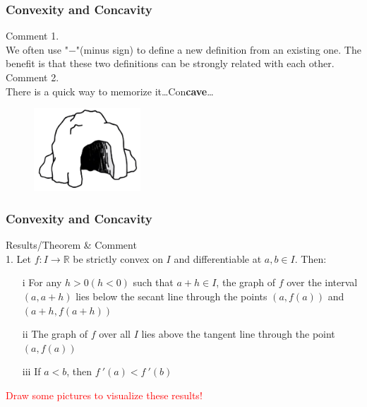 \documentclass{beamer}
\begin{document}
\begin{frame}
    \frametitle{Convexity and Concavity}
    Comment 1. \\
    \vspace{0.5em}
    \hspace{1em}
    We often use "$-$"(minus sign) to define a new definition from an existing one. The benefit is that these two definitions can
    be strongly related with each other.\\
    \vspace{1em}
    Comment 2.\\
    \hspace{1em}
    There is a quick way to memorize it\dots\hspace{2em}Con\textbf{cave}\dots
    \begin{figure}[H]
        \centering
        \includegraphics[width=4cm]{Concave.png}
    \end{figure}

\end{frame}

\begin{frame}
    \frametitle{Convexity and Concavity}
    Results/Theorem \& Comment\\
    \vspace{1em}
    1. Let $f:I\rightarrow\mathbb{R}$ be strictly convex on $I$ and differentiable at $a,b\in I$. Then:
    \begin{enumerate}
        \item[i] For any $h>0(h<0)$ such that $a+h\in I$, the graph of $f$ over the interval $(a,a+h)$ lies below the secant line through the
            points $(a,f(a))$ and $(a+h, f(a+h))$
        \item[ii] The graph of $f$ over all $I$ lies above the tangent line through the point $(a, f(a))$
        \item[iii] If $a<b$, then $f~'(a)<f~'(b)$
    \end{enumerate}
    \vspace{1em}
    \textcolor{red}{Draw some pictures to visualize these results!}
\end{frame}
\end{document}
